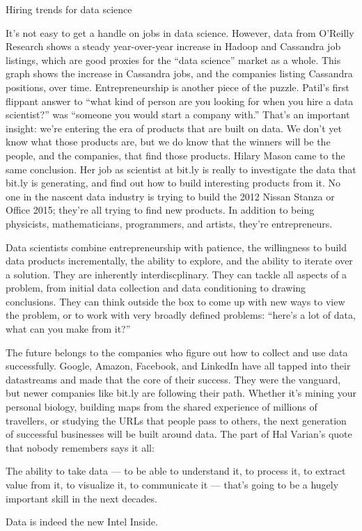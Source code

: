 Hiring trends for data science


It’s not easy to get a handle on jobs in data science. However, data from O’Reilly Research shows a steady year-over-year increase in Hadoop and Cassandra job listings, which are good proxies for the “data science” market as a whole. This graph shows the increase in Cassandra jobs, and the companies listing Cassandra positions, over time.
Entrepreneurship is another piece of the puzzle. Patil’s first flippant answer to “what kind of person are you looking for when you hire a data scientist?” was “someone you would start a company with.” That’s an important insight: we’re entering the era of products that are built on data. We don’t yet know what those products are, but we do know that the winners will be the people, and the companies, that find those products. Hilary Mason came to the same conclusion. Her job as scientist at bit.ly is really to investigate the data that bit.ly is generating, and find out how to build interesting products from it. No one in the nascent data industry is trying to build the 2012 Nissan Stanza or Office 2015; they’re all trying to find new products. In addition to being physicists, mathematicians, programmers, and artists, they’re entrepreneurs.

Data scientists combine entrepreneurship with patience, the willingness to build data products incrementally, the ability to explore, and the ability to iterate over a solution. They are inherently interdiscplinary. They can tackle all aspects of a problem, from initial data collection and data conditioning to drawing conclusions. They can think outside the box to come up with new ways to view the problem, or to work with very broadly defined problems: “here’s a lot of data, what can you make from it?”

The future belongs to the companies who figure out how to collect and use data successfully. Google, Amazon, Facebook, and LinkedIn have all tapped into their datastreams and made that the core of their success. They were the vanguard, but newer companies like bit.ly are following their path. Whether it’s mining your personal biology, building maps from the shared experience of millions of travellers, or studying the URLs that people pass to others, the next generation of successful businesses will be built around data. The part of Hal Varian’s quote that nobody remembers says it all:

The ability to take data — to be able to understand it, to process it, to extract value from it, to visualize it, to communicate it — that’s going to be a hugely important skill in the next decades.

Data is indeed the new Intel Inside.
